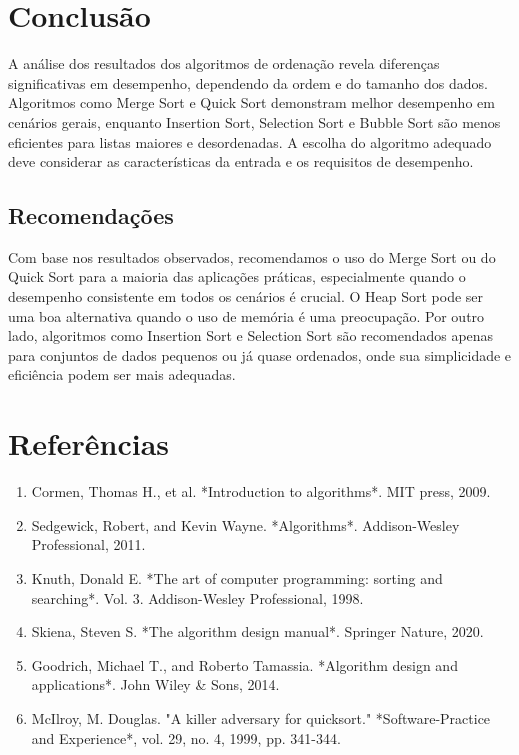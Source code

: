 \documentclass[12pt,a4paper]{article}
\begin{document}
\section{Conclusão}
A análise dos resultados dos algoritmos de ordenação revela diferenças significativas em desempenho, dependendo da ordem e do tamanho dos dados. Algoritmos como Merge Sort e Quick Sort demonstram melhor desempenho em cenários gerais, enquanto Insertion Sort, Selection Sort e Bubble Sort são menos eficientes para listas maiores e desordenadas. A escolha do algoritmo adequado deve considerar as características da entrada e os requisitos de desempenho.

\subsection{Recomendações}
Com base nos resultados observados, recomendamos o uso do Merge Sort ou do Quick Sort para a maioria das aplicações práticas, especialmente quando o desempenho consistente em todos os cenários é crucial. O Heap Sort pode ser uma boa alternativa quando o uso de memória é uma preocupação. Por outro lado, algoritmos como Insertion Sort e Selection Sort são recomendados apenas para conjuntos de dados pequenos ou já quase ordenados, onde sua simplicidade e eficiência podem ser mais adequadas.

\section{Referências}
\begin{enumerate}
    \item Cormen, Thomas H., et al. *Introduction to algorithms*. MIT press, 2009.
    \item Sedgewick, Robert, and Kevin Wayne. *Algorithms*. Addison-Wesley Professional, 2011.
    \item Knuth, Donald E. *The art of computer programming: sorting and searching*. Vol. 3. Addison-Wesley Professional, 1998.
    \item Skiena, Steven S. *The algorithm design manual*. Springer Nature, 2020.
    \item Goodrich, Michael T., and Roberto Tamassia. *Algorithm design and applications*. John Wiley \& Sons, 2014.
    \item McIlroy, M. Douglas. "A killer adversary for quicksort." *Software-Practice and Experience*, vol. 29, no. 4, 1999, pp. 341-344.
\end{enumerate}
\end{document}

